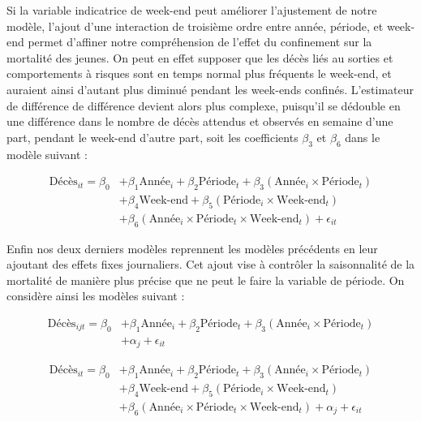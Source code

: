 \documentclass[titlepage]{article}
\begin{document}
Si la variable indicatrice de week-end peut améliorer l'ajustement de notre modèle, l'ajout d'une interaction de troisième ordre entre année, période, et week-end permet d'affiner notre compréhension de l'effet du confinement sur la mortalité des jeunes. On peut en effet supposer que les décès liés au sorties et comportements à risques sont en temps normal plus fréquents le week-end, et auraient ainsi d'autant plus diminué pendant les week-ends confinés. L'estimateur de différence de différence devient alors plus complexe, puisqu'il se dédouble en une différence dans le nombre de décès attendus et observés en semaine d'une part, pendant le week-end d'autre part, soit les coefficients $\beta_3$ et $\beta_6$ dans le modèle suivant :

\begin{equation}
\begin{aligned}
  \textrm{Décès}_{it} = \beta_0 &+ \beta_1 \textrm{Année}_i + \beta_2 \textrm{Période}_t + \beta_3 (\textrm{Année}_i \times \textrm{Période}_t)\\
   &+ \beta_4 \textrm{Week-end} + \beta_5 (\textrm{Période}_i \times \textrm{Week-end}_t)\\
   &+ \beta_6 (\textrm{Année}_i \times \textrm{Période}_t \times \textrm{Week-end}_t) + \epsilon_{it}
\end{aligned}
\end{equation}

Enfin nos deux derniers modèles reprennent les modèles précédents en leur ajoutant des effets fixes journaliers. Cet ajout vise à contrôler la saisonnalité de la mortalité de manière plus précise que ne peut le faire la variable de période. On considère ainsi les modèles suivant :

\begin{equation}
\begin{aligned}
  \textrm{Décès}_{ijt} = \beta_0 &+ \beta_1 \textrm{Année}_i + \beta_2 \textrm{Période}_t + \beta_3 (\textrm{Année}_i \times \textrm{Période}_t) \\
  &+ \alpha_j + \epsilon_{it}
\end{aligned}
\end{equation}

\begin{equation}
\begin{aligned}
  \textrm{Décès}_{it} = \beta_0 &+ \beta_1 \textrm{Année}_i + \beta_2 \textrm{Période}_t + \beta_3 (\textrm{Année}_i \times \textrm{Période}_t)\\
   &+ \beta_4 \textrm{Week-end} + \beta_5 (\textrm{Période}_i \times \textrm{Week-end}_t)\\
   &+ \beta_6 (\textrm{Année}_i \times \textrm{Période}_t \times \textrm{Week-end}_t) + \alpha_j + \epsilon_{it}
\end{aligned}
\end{equation}
\end{document}
